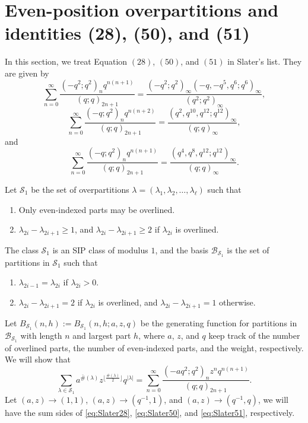 \documentclass[11pt]{amsart}
\theoremstyle{definition}
\theoremstyle{remark}
\numberwithin{equation}{section}
\begin{document}
\section{Even-position overpartitions and identities (28), (50), and (51)}\label{sec:S1}
In this section, we treat Equation $(28)$, $(50)$, and $(51)$ in Slater's list. They are given by
\begin{equation}\label{eq:Slater28}
\sum_{n=0}^{\infty}\frac{(-q^2;q^2)_{n}q^{n(n+1)}}{(q;q)_{2n+1}}
=\dfrac{(-q^2;q^2)_{\infty}(-q,-q^5,q^6;q^6)_{\infty}}{(q^2;q^2)_{\infty}},
\end{equation}
\begin{equation}\label{eq:Slater50}
\sum_{n=0}^{\infty}\frac{(-q;q^2)_nq^{n(n+2)}}{(q;q)_{2n+1}}
=\frac{(q^2,q^{10},q^{12};q^{12})_{\infty}}{(q;q)_{\infty}},
\end{equation}
and
\begin{equation}\label{eq:Slater51}
\sum_{n=0}^{\infty}\frac{(-q;q^2)_nq^{n(n+1)}}{(q;q)_{2n+1}}
=\frac{(q^4,q^8,q^{12};q^{12})_{\infty}}{(q;q)_{\infty}}.
\end{equation}

Let $\mathcal{S}_1$ be the set of overpartitions $\lambda=(\lambda_1,\lambda_2,\ldots,\lambda_{\ell})$ such that
\begin{enumerate}
    \item Only even-indexed parts may be overlined.
    \item $\lambda_{2i}-\lambda_{2i+1}\geq1$, and $\lambda_{2i}-\lambda_{2i+1}\geq2$ if $\lambda_{2i}$ is overlined.
\end{enumerate}
The class $\mathcal{S}_1$ is an SIP class of modulus $1$, and the basis $\mathcal{B}_{\mathcal{S}_1}$ is the set of partitions in $\mathcal{S}_1$ such that
\begin{enumerate}
    \item $\lambda_{2i-1}=\lambda_{2i}$ if $\lambda_{2i}>0$.
    \item $\lambda_{2i}-\lambda_{2i+1}=2$ if $\lambda_{2i}$ is overlined, and $\lambda_{2i}-\lambda_{2i+1}=1$ otherwise.
\end{enumerate}
Let $B_{\mathcal S_1}(n,h):=B_{\mathcal S_1}(n,h;a,z,q)$ be the generating function for partitions in $\mathcal{B}_{\mathcal{S}_1}$ with length $n$ and largest part $h$, where $a$, $z$, and $q$ keep track of the number of overlined parts, the number of even-indexed parts, and the weight, respectively. We will show that
$$\sum_{\lambda\in\mathcal{S}_1}a^{\overline{\#}(\lambda)}z^{\lfloor\frac{\#(\lambda)}{2}\rfloor}q^{|\lambda|}=\sum_{n=0}^{\infty}\frac{(-aq^2;q^2)_{n}z^nq^{n(n+1)}}{(q;q)_{2n+1}}.$$
Let $(a,z)\to(1,1)$, $(a,z)\to(q^{-1},1)$, and $(a,z)\to(q^{-1},q)$, we will have the sum sides of \eqref{eq:Slater28}, \eqref{eq:Slater50}, and \eqref{eq:Slater51}, respectively.
\end{document}

